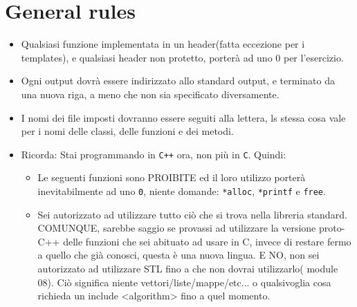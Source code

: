 

\chapter{General rules}


    \begin{itemize}

		\item Qualsiasi funzione implementata in un header(fatta eccezione per i templates),
		e qualsiasi header non protetto, porterà ad uno 0 per l'esercizio.

		\item Ogni output dovrà essere indirizzato allo standard output, e terminato da una
		nuova riga, a meno che non sia specificato diversamente.

		\item I nomi dei file imposti dovranno essere seguiti alla lettera,
		ls stessa cosa vale per i nomi delle classi, delle funzioni e dei metodi.

		\item Ricorda: Stai programmando in \texttt{C++} ora, non più in
          \texttt{C}. Quindi:
		  
		  \begin{itemize}
		  
		  \item	Le seguenti funzioni sono PROIBITE ed il loro utilizzo
		  porterà inevitabilmente ad uno \texttt{0}, niente domande: \texttt{*alloc},
		  \texttt{*printf} e \texttt{free}.
		  

		  \item Sei autorizzato ad utilizzare tutto ciò che si trova nella libreria
		  standard. COMUNQUE, sarebbe saggio se provassi ad utilizzare 
		  la versione proto-C++ delle funzioni che sei abituato ad usare in C,
		  invece di restare fermo a quello che già conosci, questa è una nuova lingua.
		  E NO, non sei autorizzato ad utilizzare STL fino a che non dovrai utilizzarlo(
		  module 08). Ciò significa niente vettori/liste/mappe/etc... o qualsivoglia cosa
		  richieda un include <algorithm> fino a quel momento.
		  


\end{itemize}
\end{itemize}
